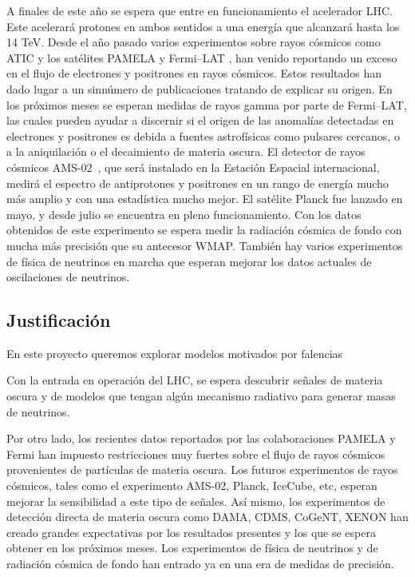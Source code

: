 A finales de este año se espera que entre en funcionamiento el acelerador LHC. Este acelerará protones en ambos sentidos a una energía que alcanzará hasta los 14 TeV. 
Desde el año pasado varios experimentos sobre rayos cósmicos como ATIC \cite{:2008zzr} y los satélites PAMELA \cite{Adriani:2008zr} y Fermi--LAT \cite{Abdo:2009zk}, han venido reportando un exceso en el flujo de electrones y positrones en rayos cósmicos. Estos resultados han dado lugar a un sinnúmero de publicaciones tratando de explicar su origen. En los próximos meses se esperan medidas de rayos gamma por parte de Fermi--LAT, las cuales pueden ayudar a discernir si el origen de las anomalías detectadas en electrones y positrones es debida a fuentes astrofísicas como pulsares cercanos, o a la aniquilación o el decaimiento de materia oscura. El detector de rayos cósmicos AMS-02~\cite{ams:2009},  que será instalado en la Estación Espacial  internacional, medirá el espectro de antiprotones y positrones en un rango de energía mucho más amplio y con una estadística mucho mejor.
El satélite Planck fue lanzado en mayo, y desde julio  se encuentra en pleno funcionamiento.  Con los datos obtenidos de este experimento se espera medir la radiación cósmica de fondo con mucha más precisión que su antecesor WMAP. También hay varios experimentos de física de neutrinos en marcha que esperan mejorar los datos actuales de oscilaciones de neutrinos.


\subsection{Justificación}
En este proyecto queremos explorar modelos motivados por falencias 






 



Con la entrada en operación del LHC, se espera descubrir señales de materia oscura y de modelos que tengan algún mecanismo radiativo para generar masas de neutrinos.

Por otro lado, los recientes datos reportados por las colaboraciones PAMELA y Fermi han impuesto restricciones muy fuertes sobre el flujo de rayos cósmicos provenientes de partículas de materia oscura. Los futuros experimentos de rayos cósmicos, tales como el experimento AMS-02, Planck, IceCube, etc, esperan mejorar la sensibilidad a este tipo de señales. Así mismo, los experimentos de detección directa de materia oscura como DAMA, CDMS, CoGeNT, XENON han creado grandes expectativas por los resultados presentes y los que se espera obtener en los próximos meses. Los experimentos de física de neutrinos y de radiación cósmica de fondo han entrado ya en una era de medidas de precisión.

